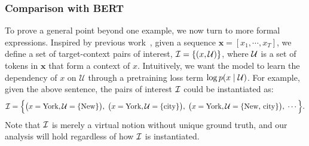 \subsubsection{Comparison with BERT}
\label{sec:compare-bert}



To prove a general point beyond one example, we now turn to more formal expressions. Inspired by previous work~\cite{yang2017breaking}, given a sequence $\mathbf{x} = [x_1, \cdots, x_T]$, we define a set of target-context pairs of interest, $\mathcal{I} = \{(x, \mathcal{U})\}$, where $\mathcal{U}$ is a set of tokens in $\mathbf{x}$ that form a context of $x$. Intuitively, we want the model to learn the dependency of $x$ on $\mathcal{U}$ through a pretraining loss term $\log p(x \mid \mathcal{U})$.
For example, given the above sentence, the pairs of interest $\mathcal{I}$ could be instantiated as:
\[
\mc{I} = \Big\{ 
\rbr[\big]{x = \text{York}, \mc{U} = \{\text{New}\}},\;
\rbr[\big]{x = \text{York}, \mc{U} = \{\text{city}\}},\; 
\rbr[\big]{x = \text{York}, \mc{U} = \{\text{New, city}\}},\;
\cdots
\Big\}.
\]
Note that $\mathcal{I}$ is merely a virtual notion without unique ground truth, and our analysis will hold regardless of how $\mathcal{I}$ is instantiated. 

